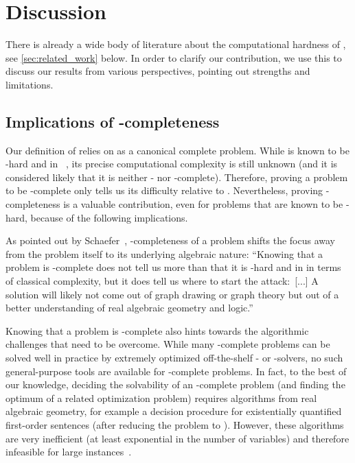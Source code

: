 \section{Discussion}
\label{sec:discussion}

There is already a wide body of literature about the computational hardness of \ERM, see \cref{sec:related_work} below.
In order to clarify our contribution, we use this  to discuss our results from various perspectives, pointing out strengths and limitations.

\subsection{Implications of \ER-completeness}
Our definition of \ER relies on \ETR as a canonical complete problem.
While \ETR is known to be \NP-hard and in \PSPACE~\cite{Canny1988_PSPACE, Shor1991_Stretchability}, its precise computational complexity is still unknown (and it is considered likely that it is neither \NP- nor \PSPACE-complete).
Therefore, proving a problem to be \ER-complete only tells us its difficulty relative to \ETR.
Nevertheless, proving \ER-completeness is a valuable contribution, even for problems that are known to be \NP-hard, because of the following implications.

As pointed out by Schaefer~\cite{Schaefer2010_GeometryTopology}, \ER-completeness of a problem shifts the focus away from the problem itself to its underlying algebraic nature:
\enquote{Knowing that a problem is \ER-complete does not tell us more than that it is \NP-hard and in \PSPACE{} in terms of classical complexity, but it does tell us where to start the attack:~[...]
A solution will likely not come out of graph drawing or graph theory but out of a better understanding of real algebraic geometry and logic.}~\cite{Schaefer2010_GeometryTopology}

Knowing that a problem is \ER-complete also hints towards the algorithmic challenges that need to be overcome.
While many \NP-complete problems can be solved well in practice by extremely optimized
off-the-shelf \SAT- or \MIP-solvers, no such 
%
general-purpose  %
tools are available for \ER-complete problems.
In fact, to the best of our knowledge,
%
%
deciding the solvability of an \ER-complete problem (and finding the optimum
of a related optimization problem)  %
requires algorithms from real algebraic geometry, for example a decision procedure for
existentially quantified first-order sentences (after reducing the problem to \ETR).
However, these algorithms are very inefficient (at least exponential in the number of
variables) and therefore infeasible for large instances~\cite{Passmore2009_Experiments}.

